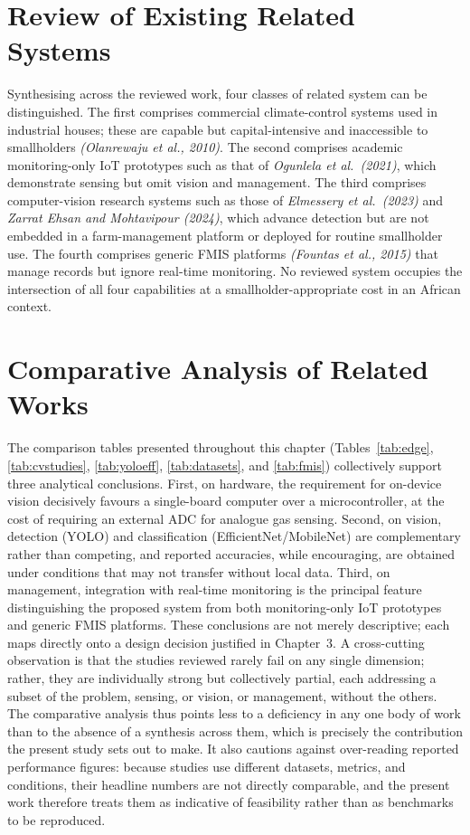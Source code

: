 \documentclass[12pt,a4paper]{report}
\begin{document}
\section{Review of Existing Related Systems}

Synthesising across the reviewed work, four classes of related system can be distinguished. The first comprises commercial climate-control systems used in industrial houses; these are capable but capital-intensive and inaccessible to smallholders \textit{(Olanrewaju et al., 2010)}. The second comprises academic monitoring-only IoT prototypes such as that of \textit{Ogunlela et al.\ (2021)}, which demonstrate sensing but omit vision and management. The third comprises computer-vision research systems such as those of \textit{Elmessery et al.\ (2023)} and \textit{Zarrat Ehsan and Mohtavipour (2024)}, which advance detection but are not embedded in a farm-management platform or deployed for routine smallholder use. The fourth comprises generic FMIS platforms \textit{(Fountas et al., 2015)} that manage records but ignore real-time monitoring. No reviewed system occupies the intersection of all four capabilities at a smallholder-appropriate cost in an African context.

\section{Comparative Analysis of Related Works}

The comparison tables presented throughout this chapter (Tables~\ref{tab:edge}, \ref{tab:cvstudies}, \ref{tab:yoloeff}, \ref{tab:datasets}, and \ref{tab:fmis}) collectively support three analytical conclusions. First, on hardware, the requirement for on-device vision decisively favours a single-board computer over a microcontroller, at the cost of requiring an external ADC for analogue gas sensing. Second, on vision, detection (YOLO) and classification (EfficientNet/MobileNet) are complementary rather than competing, and reported accuracies, while encouraging, are obtained under conditions that may not transfer without local data. Third, on management, integration with real-time monitoring is the principal feature distinguishing the proposed system from both monitoring-only IoT prototypes and generic FMIS platforms. These conclusions are not merely descriptive; each maps directly onto a design decision justified in Chapter~3. A cross-cutting observation is that the studies reviewed rarely fail on any single dimension; rather, they are individually strong but collectively partial, each addressing a subset of the problem, sensing, or vision, or management, without the others. The comparative analysis thus points less to a deficiency in any one body of work than to the absence of a synthesis across them, which is precisely the contribution the present study sets out to make. It also cautions against over-reading reported performance figures: because studies use different datasets, metrics, and conditions, their headline numbers are not directly comparable, and the present work therefore treats them as indicative of feasibility rather than as benchmarks to be reproduced.
\end{document}
